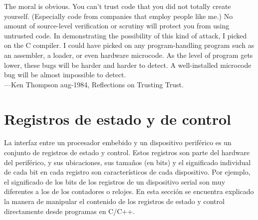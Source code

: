 \documentclass[output=paper, 
colorlinks,
citecolor=brown,
newtxmath
]{langscibook}
\begin{document}
\hfill\begin{minipage}{0.8\linewidth} \footnotesize
The moral is obvious. You can't trust code that you did
not totally create yourself. (Especially code from companies
that employ people like me.) No amount of
source-level verification or scrutiny will protect you
from using untrusted code. In demonstrating the possibility
of this kind of attack, I picked on the C compiler.
I could have picked on any program-handling program
such as an assembler, a loader, or even hardware microcode.
As the level of program gets lower, these bugs
will be harder and harder to detect. A well-installed
microcode bug will be almost impossible to detect.\\ 
—Ken Thompson aug-1984, Reflections on Trusting Trust.
\end{minipage}


\def\maketitle{

 \makeatletter
 {\color{bl} \centering \huge \sc \textbf{
\large \vspace*{-8pt} \color{black} Programación de Sistemas Embebidos
 \vspace*{8pt} }\par}
 \makeatother


 \makeatletter
 {\centering \small 
 	Departamento de Ingeniería de Computadoras \\
 	Facultad de Informática - Universidad Nacional del Comahue \\
 	\vspace{20pt} }
 \makeatother

}








\section {Registros de estado y de control}

La interfaz entre un procesador embebido y un dispositivo periférico
es un conjunto de registros de estado y control. Estos registros son parte
del hardware del periférico, y sus ubicaciones, sus tamaños (en bits) y el
significado individual de cada bit en cada registro son característicos 
de cada dispositivo. Por ejemplo, 
el significado de los bits de los registros de un dispositivo serial son 
muy diferentes a los
de los contadores o relojes. En esta sección se encuentra explicado la 
manera de manipular el contenido de los registros de estado y control
directamente desde programas en C/C++.
\end{document}
